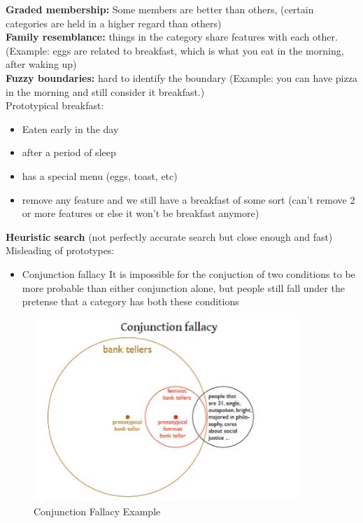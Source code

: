 \documentclass{article}
\begin{document}
\noindent \textbf{Graded membership:} Some members are better than others, (certain categories are held in a higher regard than others) \\
\textbf{Family resemblance:} things in the category share features with each other. (Example: eggs are related to breakfast, which is what you eat in the morning, after waking up) \\
\textbf{Fuzzy boundaries:} hard to identify the boundary (Example: you can have pizza in the morning and still consider it breakfast.) \\

Prototypical breakfast: 
\begin{itemize}
    \item Eaten early in the day
    \item after a period of sleep 
    \item has a special menu (eggs, toast, etc)
    \item remove any feature and we still have a breakfast of some sort (can't remove 2 or more features or else it won't be breakfast anymore)
\end{itemize}
\textbf{Heuristic search} (not perfectly accurate search but close enough and fast) \\

\noindent Misleading of prototypes: 
\begin{itemize}
    \item Conjunction fallacy
        \subitem It is impossible for the conjuction of two conditions to be more probable than either conjunction alone, but people still fall under the pretense that a category has both these conditions 
\end{itemize}

\begin{figure}[htp]
\centering
\includegraphics[width=10cm]{images/conjunctionfallacy.JPG}
\caption{Conjunction Fallacy Example}
\label{fig: conjunction}
\end{figure}
\end{document}

